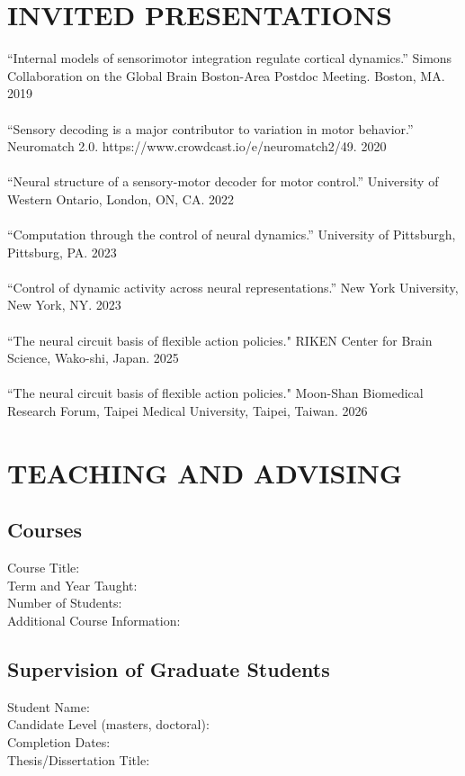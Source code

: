 \documentclass[a4paper,9pt]{extarticle}
\begin{document}
\section*{INVITED PRESENTATIONS}
	“Internal models of sensorimotor integration regulate cortical dynamics.” Simons Collaboration on the Global Brain Boston-Area Postdoc Meeting. Boston, MA. 2019\\
	\\
“Sensory decoding is a major contributor to variation in motor behavior.” Neuromatch 2.0. https://www.crowdcast.io/e/neuromatch2/49. 2020\\
\\
“Neural structure of a sensory-motor decoder for motor control.” University of Western Ontario, London, ON, CA. 2022	\\
\\
“Computation through the control of neural dynamics.” University of Pittsburgh, Pittsburg, PA. 2023	\\
\\
“Control of dynamic activity across neural representations.” New York University, New York, NY. 2023	\\
\\
“The neural circuit basis of flexible action policies." RIKEN Center for Brain Science, Wako-shi, Japan. 2025	\\
\\
“The neural circuit basis of flexible action policies." Moon-Shan Biomedical Research Forum, Taipei Medical University, Taipei, Taiwan. 2026 \\

\section*{TEACHING AND ADVISING}
    \subsection*{Courses}
        Course Title:\\
        Term and Year Taught:\\
        Number of Students:\\
        Additional Course Information:
    \subsection*{Supervision of Graduate Students}
        Student Name:\\
        Candidate Level (masters, doctoral):\\
        Completion Dates:\\
        Thesis/Dissertation Title: 
\end{document}
